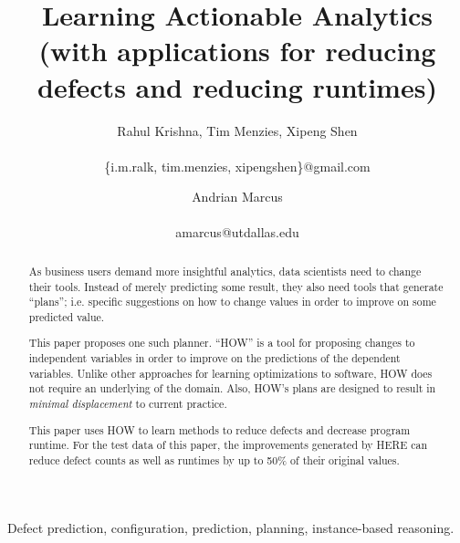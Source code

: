 \documentclass[conference]{IEEEtran}
\title{Learning Actionable Analytics 
 (with applications for reducing defects and reducing runtimes)}
\author{
%
%
Rahul Krishna, Tim Menzies, Xipeng Shen\\
       \affaddr{Computer Science, NcState, USA}\\
       \{i.m.ralk, tim.menzies, xipengshen\}@gmail.com
\and
 Andrian Marcus\\
       \affaddr{Computer Science, UtDallas, USA}\\
       {amarcus@utdallas.edu} }
\begin{document}
  \maketitle
  
  
   
  \begin{abstract}
 As business users demand more insightful
 analytics, data scientists need to change
 their tools. Instead of merely predicting 
 some result, they also need tools that generate ``plans'';
 i.e. specific suggestions on  how to change values in order to
 improve on some predicted value.
 
 This paper proposes one such planner. ``HOW'' is a 
 tool for proposing changes to independent
 variables in order to improve on 
 the predictions of the dependent variables. Unlike other approaches
 for learning optimizations to software, HOW does not require
 an underlying of the domain. Also, HOW's plans
 are designed to result in {\em minimal displacement}
 to current practice.
 
 This paper uses  HOW to learn methods
 to reduce defects and decrease program runtime.
 For the test data of this paper, the improvements generated by HERE can reduce
 defect counts as well as runtimes by up to
 50\% of their original values.
  \end{abstract}
  \begin{IEEEkeywords}
Defect prediction, configuration, prediction, planning, instance-based reasoning.
  \end{IEEEkeywords}
  
\end{document}
